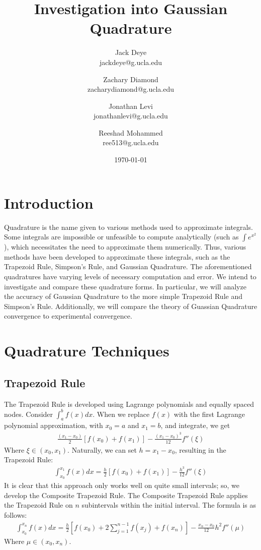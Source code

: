 \documentclass[12pt]{article}
\title{Investigation into Gaussian Quadrature}
\author{
    Jack Deye\\
    jackdeye@g.ucla.edu
    \and
    Zachary Diamond\\
    zacharydiamond@g.ucla.edu
    \and
    Jonathan Levi\\
    jonathanlevi@g.ucla.edu
    \and
    Reeshad Mohammed\\
    ree513@g.ucla.edu
}
\date{\today}
\begin{document}
\maketitle

\tableofcontents

\newpage

\section{Introduction}

Quadrature is the name given to various methods used to approximate integrals. Some integrals are
impossible or unfeasible to compute analytically (such as $\int e^{x^2}$), which necessitates the need to approximate them numerically.
Thus, various methods have been developed to approximate these integrals, such as the Trapezoid Rule, Simpson's Rule, and Gaussian Quadrature.
The aforementioned quadratures have varying levels of necessary computation and error. We intend to investigate and compare these quadrature forms.
In particular, we will analyze the accuracy of Gaussian Quadrature to the more simple Trapezoid Rule and Simpson's Rule.
Additionally, we will compare the theory of Guassian Quadrature convergence to experimental convergence.

\section{Quadrature Techniques}
\subsection{Trapezoid Rule}
The Trapezoid Rule is developed using Lagrange polynomials and equally spaced nodes. Consider $\int_a^b f(x)dx$. When we replace $f(x)$
with the first Lagrange polynomial approximation, with $x_0 = a$ and $x_1 = b$, and integrate, we get
\begin{align*}
	\frac{(x_1 - x_0)}{2}[f(x_0) + f(x_1)] - \frac{(x_1 - x_0)^3}{12}f''(\xi)
\end{align*}
Where $\xi \in (x_0, x_1)$. Naturally, we can set $h = x_1 - x_0$, resulting in the Trapezoid Rule:
\begin{align*}
	\int_{x_0}^{x_1}f(x)dx = \frac{h}{2}[f(x_0) + f(x_1)] - \frac{h^3}{12}f''(\xi)
\end{align*}
It is clear that this approach only works well on quite small intervals; so, we develop the Composite Trapezoid Rule. The Composite Trapezoid Rule
applies the Trapezoid Rule on $n$ subintervals within the initial interval. The formula is as follows:
\begin{align*}
	\int_{x_0}^{x_n}f(x)dx = \frac{h}{2}[f(x_0) + 2\sum_{j=1}^{n-1}f(x_j) + f(x_n)] - \frac{x_n - x_0}{12}h^2f''(\mu)
\end{align*}
Where $\mu \in (x_0, x_n)$.
\end{document}
